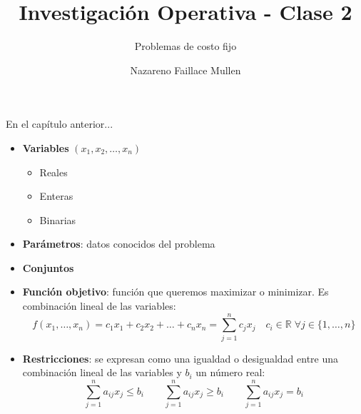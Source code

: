 \documentclass[10pt, aspectratio=169]{beamer}
\title{Investigación Operativa - Clase 2}
\subtitle{Problemas de costo fijo}
\date{}
\author{Nazareno Faillace Mullen}
\institute{Departamento de Matemática - FCEN - UBA}
\begin{document}
\maketitle


\begin{frame}[fragile]{En el capítulo anterior...}
    \begin{itemize}
        \item \textbf{Variables} $(x_1, x_2, \dots, x_n)$
            \begin{itemize}
                \item Reales
                \item Enteras
                \item Binarias
            \end{itemize}
        \item \textbf{Parámetros}: datos conocidos del problema
        \item \textbf{Conjuntos}
        \item \textbf{Función objetivo}: función que queremos maximizar o minimizar. Es combinación lineal de las variables:
        \small
        \[ f(x_1, \dots, x_n)= c_1x_1+c_2x_2+\dots+c_nx_n = \sum_{j=1}^n c_jx_j \quad c_i\in\mathbb{R}\;\forall j\in\{1,\dots,n\}  \]
        \normalsize
        \item \textbf{Restricciones}: se expresan como una igualdad o desigualdad entre una combinación lineal de las variables y $b_i$ un número real:
        \small{
        \[ \sum_{j=1}^n a_{ij}x_j \leq b_i \qquad \sum_{j=1}^n a_{ij}x_j \geq b_i \qquad \sum_{j=1}^n a_{ij}x_j = b_i\]        
        }
    \end{itemize}
\end{frame}
\end{document}
